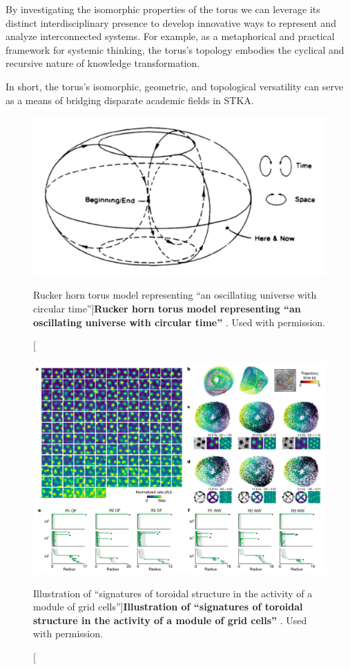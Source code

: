 By investigating the isomorphic properties of the torus we can leverage its distinct interdisciplinary presence to develop innovative ways to represent and analyze interconnected systems. For example, as a metaphorical and practical framework for systemic thinking, the torus's topology embodies the cyclical and recursive nature of knowledge transformation.

In short, the torus’s isomorphic, geometric, and topological versatility can serve as a means of bridging disparate academic fields in STKA. 

\FloatBarrier

\begin{figure}[h]
    \centering
    \includegraphics[width=0.5\linewidth]{figures/f19.png}
    \caption[Rucker horn torus model representing ``an oscillating universe with circular time”]{\textbf{Rucker horn torus model representing “an oscillating universe with circular time”} \citep{rucker_infinity_2005}. Used with permission.}
    \label{fig:19}
\end{figure}

\begin{figure}[h]
    \centering
    \includegraphics[width=0.5\linewidth]{figures/f20.png}
    \caption[Illustration of ``signatures of toroidal structure in the activity of a module of grid cells”]{\textbf{Illustration of ``signatures of toroidal structure in the activity of a module of grid cells”} \citep[p. 124]{gardner_toroidal_2022}. Used with permission.}
    \label{fig:20}
\end{figure}

